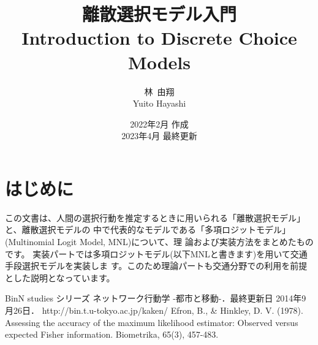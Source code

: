\documentclass[a4paper,11pt,oneside,uplatex]{jsbook}
\title{{\huge 離散選択モデル入門}\\{\large Introduction to Discrete Choice Models} \\ 
$\,$\\$\,$\\$\,$\\$\,$\\$\,$\\$\,$\\$\,$\\}
\author{林~由翔\\Yuito Hayashi}
\date{2022年2月 作成 \\ 2023年4月 最終更新}
\theoremstyle{definition}
\begin{document}
\maketitle
\frontmatter
\chapter{はじめに}
この文書は、人間の選択行動を推定するときに用いられる「離散選択モデル」と、離散選択モデルの
中で代表的なモデルである「多項ロジットモデル」(Multinomial Logit Model, MNL)について、理
論および実装方法をまとめたものです。
実装パートでは多項ロジットモデル(以下MNLと書きます)を用いて交通手段選択モデルを実装しま
す。このため理論パートも交通分野での利用を前提とした説明となっています。

\setcounter{tocdepth}{2}
\tableofcontents

\mainmatter







\backmatter

\begin{thebibliography}{99}
     BinN studies シリーズ
    ネットワーク行動学 -都市と移動-．最終更新日 2014年9月26日． http://bin.t.u-tokyo.ac.jp/kaken/
     Efron, B., \& Hinkley, D. V. (1978). Assessing the accuracy of the maximum likelihood estimator: Observed versus expected Fisher information. Biometrika, 65(3), 457-483.
\end{thebibliography}
\end{document}
